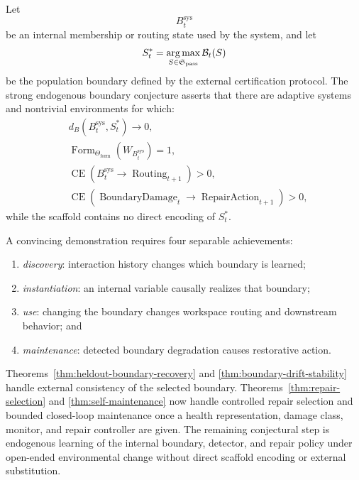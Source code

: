 Let
\[
B_t^{\mathrm{sys}}
\]
be an internal membership or routing state used by the system, and let
\[
S_t^*
=
\operatorname*{arg\,max}_{S\in\mathfrak S_{\mathrm{pass}}}
\mathcal B_t(S)
\]
be the population boundary defined by the external certification protocol.
The strong endogenous boundary conjecture asserts that there are adaptive
systems and nontrivial environments for which:
\[
\boxed{
\begin{aligned}
&d_B(B_t^{\mathrm{sys}},S_t^*)\to0,\\
&\operatorname{Form}_{\Theta_{\mathrm{form}}}(W_{B_t^{\mathrm{sys}}})=1,\\
&\operatorname{CE}
\left(
B_t^{\mathrm{sys}}\to
\operatorname{Routing}_{t+1}
\right)>0,\\
&\operatorname{CE}
\left(
\operatorname{BoundaryDamage}_t\to
\operatorname{RepairAction}_{t+1}
\right)>0,
\end{aligned}
}
\]
while the scaffold contains no direct encoding of \(S_t^*\).

A convincing demonstration requires four separable achievements:
\begin{enumerate}
\item \emph{discovery}: interaction history changes which boundary is learned;
\item \emph{instantiation}: an internal variable causally realizes that
 boundary;
\item \emph{use}: changing the boundary changes workspace routing and
 downstream behavior; and
\item \emph{maintenance}: detected boundary degradation causes restorative
 action.
\end{enumerate}

Theorems~\ref{thm:heldout-boundary-recovery} and
\ref{thm:boundary-drift-stability} handle external consistency of the selected
boundary. Theorems~\ref{thm:repair-selection} and
\ref{thm:self-maintenance} now handle controlled repair selection and bounded
closed-loop maintenance once a health representation, damage class, monitor,
and repair controller are given. The remaining conjectural step is endogenous
learning of the internal boundary, detector, and repair policy under open-ended
environmental change without direct scaffold encoding or external
substitution.
